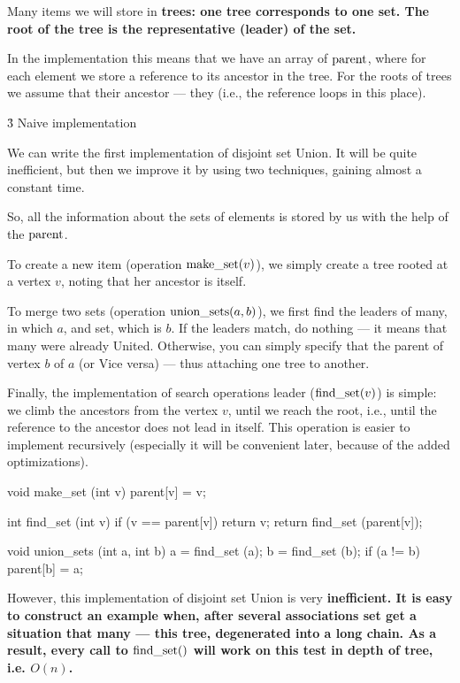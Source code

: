 Many items we will store in \bf{trees}: one tree corresponds to one set. The root of the tree is the representative (leader) of the set.

In the implementation this means that we have an array of ${\rm parent}$, where for each element we store a reference to its ancestor in the tree. For the roots of trees we assume that their ancestor --- they (i.e., the reference loops in this place).



\h3{ Naive implementation }

We can write the first implementation of disjoint set Union. It will be quite inefficient, but then we improve it by using two techniques, gaining almost a constant time.

So, all the information about the sets of elements is stored by us with the help of the ${\rm parent}$.

To create a new item (operation ${\rm make\_set}(v)$), we simply create a tree rooted at a vertex $v$, noting that her ancestor is itself.

To merge two sets (operation ${\rm union\_sets}(a,b)$), we first find the leaders of many, in which $a$, and set, which is $b$. If the leaders match, do nothing --- it means that many were already United. Otherwise, you can simply specify that the parent of vertex $b$ of $a$ (or Vice versa) --- thus attaching one tree to another.

Finally, the implementation of search operations leader (${\rm find\_set}(v)$) is simple: we climb the ancestors from the vertex $v$, until we reach the root, i.e., until the reference to the ancestor does not lead in itself. This operation is easier to implement recursively (especially it will be convenient later, because of the added optimizations).

\code
void make_set (int v) {
parent[v] = v;
}

int find_set (int v) {
if (v == parent[v])
return v;
return find_set (parent[v]);
}

void union_sets (int a, int b) {
a = find_set (a);
b = find_set (b);
if (a != b)
parent[b] = a;
}
\endcode

However, this implementation of disjoint set Union is very \bf{inefficient}. It is easy to construct an example when, after several associations set get a situation that many --- this tree, degenerated into a long chain. As a result, every call to ${\rm find\_set}()$ will work on this test in depth of tree, i.e. $O(n)$.

